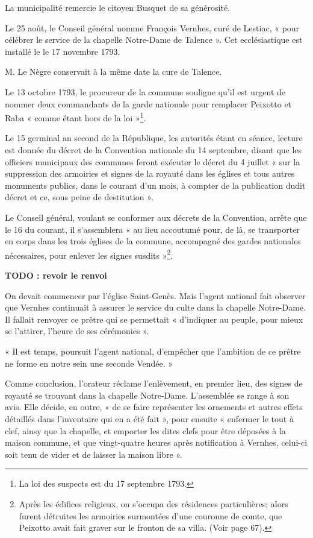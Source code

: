 \documentclass[a4paper,11pt]{book}
\begin{document}
La municipalité remercie le citoyen Busquet de sa générosité.

Le 25 août, le Conseil général nomme François Vernhes, curé de Lestiac, « pour célébrer le service de la chapelle Notre-Dame de Talence ». Cet ecclésiastique est installé le
le 17 novembre 1793.

M. Le Nègre conservait à la même date la cure de Talence.

Le 13 octobre 1793, le procureur de la commune souligne qu'il est urgent de nommer deux commandants de la garde nationale pour remplacer Peixotto et Raba « comme étant hors de la loi »\footnote{La loi des suspects est du 17 septembre 1793.}.

Le 15 germinal an second de la République, les autorités étant en séance, lecture est donnée du décret de la Convention nationale du 14 septembre, disant que les officiers
municipaux des communes feront exécuter le décret du 4 juillet « sur la suppression des armoiries et signes de la royauté dans les églises et tous autres monuments publics, dans le courant d'un mois, à compter de la publication dudit décret et ce, sous peine de destitution ».

Le Conseil général, voulant se conformer aux décrets de la Convention, arrête que le 16 du courant, il s'assemblera « au lieu accoutumé pour, de là, se transporter en corps dans les trois églises de la commune, accompagné des gardes nationales nécessaires, pour enlever les signes susdits »\footnote{Après les édifices religieux, on s'occupa des résidences particulières; alors furent détruites les armoiries surmontées d'une couronne de comte, que Peixotto avait fait graver sur le fronton de sa villa. (Voir page 67).}.

\textbf{TODO : revoir le renvoi}

On devait commencer par l'église Saint-Genès. Mais l'agent national fait observer que Vernhes continuait à assurer le service du culte dans la chapelle Notre-Dame. Il fallait renvoyer ce prêtre qui se permettait « d'indiquer au peuple, pour mieux se l'attirer, l'heure de ses cérémonies ».

« Il est temps, poursuit l'agent national, d'empêcher que l'ambition de ce prêtre ne forme en notre sein une seconde Vendée. »

Comme conclusion, l'orateur réclame l'enlèvement, en premier lieu, des signes de royauté se trouvant dans la chapelle Notre-Dame. L'assemblée se range à son avis. Elle décide, en outre, « de se faire représenter les ornements et autres effets détaillés dans l'inventaire qui en a été fait », pour ensuite « enfermer le tout à clef, ainsy que la chapelle, et emporter les dites clefs pour être déposées à la maison commune, et que vingt-quatre heures après notification à Vernhes, celui-ci soit tenu de vider et de laisser la maison libre ».
\end{document}
